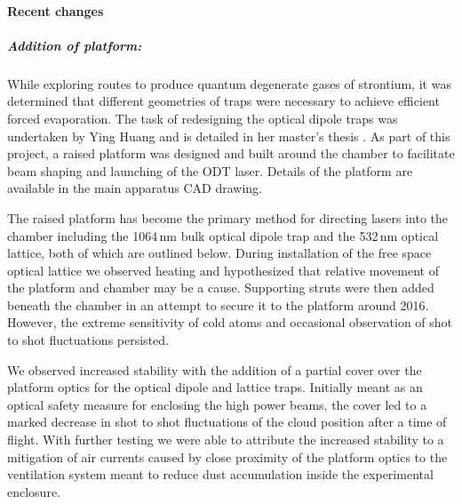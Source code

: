 \paragraph{Recent changes}
\subparagraph{Addition of platform:}
While exploring routes to produce quantum degenerate gases of strontium, it was determined that different geometries of traps were necessary to achieve efficient forced evaporation. 
The task of redesigning the optical dipole traps was undertaken by Ying Huang and is detailed in her master's thesis \cite{Huang2013}. 
As part of this project, a raised platform was designed and built around the chamber to facilitate beam shaping and launching of the ODT laser.
Details of the platform are available in the main apparatus CAD drawing.

The raised platform has become the primary method for directing lasers into the chamber including the 1064\,nm bulk optical dipole trap and the 532\,nm optical lattice, both of which are outlined below. 
During installation of the free space optical lattice we observed heating and hypothesized that relative movement of the platform and chamber may be a cause.
Supporting struts were then added beneath the chamber in an attempt to secure it to the platform around 2016.
However, the extreme sensitivity of cold atoms and occasional observation of shot to shot fluctuations persisted. %

We observed increased stability with the addition of a partial cover over the platform optics for the optical dipole and lattice traps. 
Initially meant as an optical safety measure for enclosing the high power beams, the cover led to a marked decrease in shot to shot fluctuations of the cloud position after a time of flight.
With further testing we were able to attribute the increased stability to a mitigation of air currents caused by close proximity of the platform optics to the ventilation system meant to reduce dust accumulation inside the experimental enclosure.

